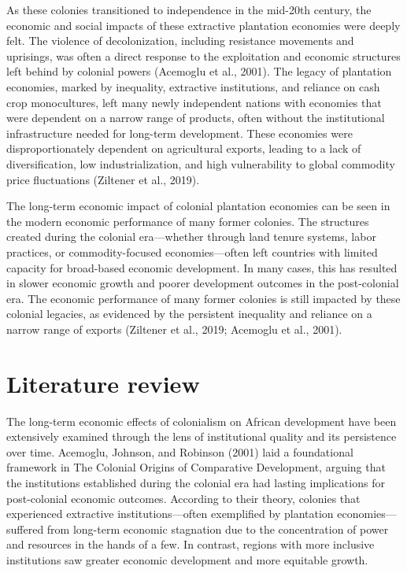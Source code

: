 \documentclass[12pt]{article}
\begin{document}
\vspace{0.2in}
\noindent As these colonies transitioned to independence in the mid-20th century, the economic and social impacts of these extractive plantation economies were deeply felt. The violence of decolonization, including resistance movements and uprisings, was often a direct response to the exploitation and economic structures left behind by colonial powers (Acemoglu et al., 2001). The legacy of plantation economies, marked by inequality, extractive institutions, and reliance on cash crop monocultures, left many newly independent nations with economies that were dependent on a narrow range of products, often without the institutional infrastructure needed for long-term development. These economies were disproportionately dependent on agricultural exports, leading to a lack of diversification, low industrialization, and high vulnerability to global commodity price fluctuations (Ziltener et al., 2019).

\vspace{0.2in}
\noindent The long-term economic impact of colonial plantation economies can be seen in the modern economic performance of many former colonies. The structures created during the colonial era—whether through land tenure systems, labor practices, or commodity-focused economies—often left countries with limited capacity for broad-based economic development. In many cases, this has resulted in slower economic growth and poorer development outcomes in the post-colonial era. The economic performance of many former colonies is still impacted by these colonial legacies, as evidenced by the persistent inequality and reliance on a narrow range of exports (Ziltener et al., 2019; Acemoglu et al., 2001).


\vspace{1 in}
\section{Literature review}

\vspace{0.2 in}
The long-term economic effects of colonialism on African development have been extensively examined through the lens of institutional quality and its persistence over time. Acemoglu, Johnson, and Robinson (2001) laid a foundational framework in The Colonial Origins of Comparative Development, arguing that the institutions established during the colonial era had lasting implications for post-colonial economic outcomes. According to their theory, colonies that experienced extractive institutions—often exemplified by plantation economies—suffered from long-term economic stagnation due to the concentration of power and resources in the hands of a few. In contrast, regions with more inclusive institutions saw greater economic development and more equitable growth.
\end{document}
